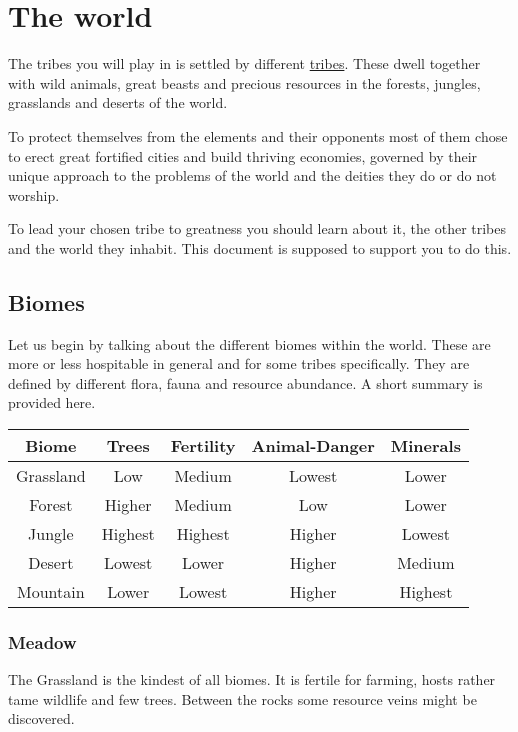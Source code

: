 \chapter{The world}\label{ch:World}

The tribes you will play in is settled by different
\hyperref[ch:Tribes]{tribes}. These dwell together with wild animals, great
beasts and precious resources in the forests, jungles, grasslands and deserts
of the world.

To protect themselves from the elements and their opponents most of them chose
to erect great fortified cities and build thriving economies, governed by their
unique approach to the problems of the world and the deities they do or do not
worship.

To lead your chosen tribe to greatness you should learn about it, the other
tribes and the world they inhabit. This document is supposed to support you to
do this.

\section{Biomes}\label{ch:World:Biomes}
Let us begin by talking about the different biomes within the world. These are
more or less hospitable in general and for some tribes specifically. They are
defined by different flora, fauna and resource abundance. A short summary is
provided here.

\begin{longtable}{cc ccc}
	\toprule
	Biome           & Trees   & Fertility & Animal-Danger & Minerals \\
	\midrule
	\Gls{Grassland} & Low     & Medium    & Lowest        & Lower    \\
	\Gls{Forest}    & Higher  & Medium    & Low           & Lower    \\
	\Gls{Jungle}    & Highest & Highest   & Higher        & Lowest   \\
	\Gls{Desert}    & Lowest  & Lower     & Higher        & Medium   \\
	\Gls{Mountain}  & Lower   & Lowest    & Higher        & Highest  \\
	\bottomrule
\end{longtable}

\subsection{Meadow}\label{ch:World:Biomes:Grassland}
The \Gls*{Grassland} is the kindest of all biomes. It is fertile for farming,
hosts rather tame wildlife and few trees. Between the rocks some resource veins
might be discovered.

